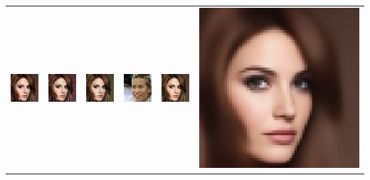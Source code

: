\begin{table}[h!]
{\begin{tabular}{cccccc}
        \includegraphics[width=.145\textwidth]{chapter4/figures/images/celebA/original/3.png} &   
        \includegraphics[width=.145\textwidth]{chapter4/figures/images/celebA/reconstruction/3.png} &
        \includegraphics[width=.145\textwidth]{chapter4/figures/images/celebA/corrected_reconstruction/3.png} &
        \includegraphics[width=.145\textwidth]{chapter4/figures/images/celebA/diffusion_decoder_beta_0.01/3.png} &
        \includegraphics[width=.145\textwidth]{chapter4/figures/images/celebA/diffusion_decoder_beta_0/3.png} &
        \includegraphics[width=.145\textwidth]{chapter4/figures/images/celebA/VAE_reconstruction/3.png} \\


\end{tabular}}
\end{table}
